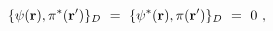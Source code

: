 \begin{equation}
\{\psi ({\bf r}),\pi ^{\ast}({\bf %
r^{\prime }})\}_{D}\ =\ \{\psi ^{\ast }({\bf r}),\pi ({\bf r^{\prime }%
})\}_{D}\ =\ 0\ ,  \label{DB2a}
\end{equation}%
